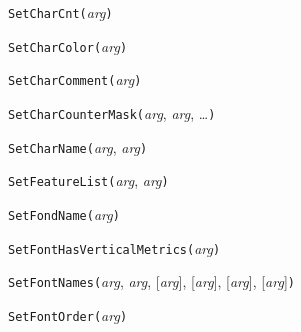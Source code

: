 

\texttt{SetCharCnt(}\textit{arg}\texttt{)}



\texttt{SetCharColor(}\textit{arg}\texttt{)}



\texttt{SetCharComment(}\textit{arg}\texttt{)}



\texttt{SetCharCounterMask(}\textit{arg}, \textit{arg}, \ldots\texttt{)}



\texttt{SetCharName(}\textit{arg}, \textit{arg}\texttt{)}



\texttt{SetFeatureList(}\textit{arg}, \textit{arg}\texttt{)}



\texttt{SetFondName(}\textit{arg}\texttt{)}



\texttt{SetFontHasVerticalMetrics(}\textit{arg}\texttt{)}



\texttt{SetFontNames(}\textit{arg}, \textit{arg}, [\textit{arg}], [\textit{arg}], [\textit{arg}], [\textit{arg}]\texttt{)}



\texttt{SetFontOrder(}\textit{arg}\texttt{)}



